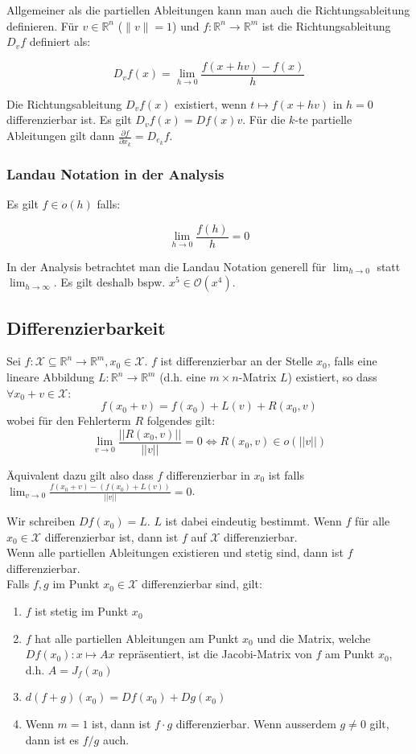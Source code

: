 \documentclass[a4paper,10pt]{article}
\def\R{\mathbb{R}}
\def\X{\mathcal{X}}
\begin{document}
Allgemeiner als die partiellen Ableitungen kann man auch die Richtungsableitung definieren. Für $v \in \R^n$ ($\lVert v \rVert = 1$) und $f: \R^n \to \R^m$ ist die Richtungsableitung $D_v f$ definiert als:

$$D_v f(x) = \lim_{h \rightarrow 0} \frac{f(x + hv) - f(x)}{h}$$

 Die Richtungsableitung $D_v f(x)$ existiert, wenn $t \mapsto f(x + hv)$ in $h = 0$ differenzierbar ist. Es gilt $D_v f(x) = D f(x) v$. Für die $k$-te partielle Ableitungen gilt dann $\frac{\partial f}{\partial x_k} = D_{e_k} f$.

\subsubsection*{Landau Notation in der Analysis}

Es gilt $f \in o(h)$ falls:

$$\lim_{h \to 0} \frac{f(h)}{h} = 0$$

In der Analysis betrachtet man die Landau Notation generell für $\lim_{h \to 0}$ statt $\lim_{h \to \infty}$. Es gilt deshalb bspw. $x^5 \in \mathcal{O}(x^4)$.

\subsection{Differenzierbarkeit}
Sei \(f: \X \subseteq \R^n \to \R^m, x_0 \in \X\). \(f\) ist differenzierbar an der Stelle \(x_0\), falls eine lineare Abbildung \(L: \R^n \to \R^m\) (d.h. eine \(m \times n\)-Matrix \(L\)) existiert, so dass \(\forall x_0 + v \in \X\):
\[f(x_0 + v) = f(x_0) + L(v) + R(x_0,v)\]
wobei für den Fehlerterm \(R\) folgendes gilt: 
$$\lim_{v \to 0} \frac{||R(x_0,v)||}{||v||} = 0 \iff R(x_0, v) \in o(||v||)$$

Äquivalent dazu gilt also dass $f$ differenzierbar in $x_0$ ist falls $\lim_{v \rightarrow 0} \frac{f(x_0 + v) - (f(x_0) + L(v))}{||v||} = 0$.

Wir schreiben \(Df(x_0) = L\). $L$ ist dabei eindeutig bestimmt. Wenn \(f\) für alle \(x_0 \in \X\) differenzierbar ist, dann ist \(f\) auf \(\X\) differenzierbar. \\

Wenn alle partiellen Ableitungen existieren und stetig sind, dann ist \(f\) differenzierbar.\\
Falls \(f,g\) im Punkt \(x_0 \in \X\) differenzierbar sind, gilt:
\begin{enumerate}
  \item \(f\) ist stetig im Punkt \(x_0\)
  \item \(f\) hat alle partiellen Ableitungen am Punkt \(x_0\) und die Matrix, welche \(Df(x_0): x \mapsto Ax\) repräsentiert, ist die Jacobi-Matrix von \(f\) am Punkt \(x_0\), d.h. \(A = J_f(x_0)\)
  \item \(d(f+g)(x_0) = Df(x_0) + Dg(x_0)\)
  \item Wenn \(m = 1\) ist, dann ist \(f\cdot g\) differenzierbar. Wenn ausserdem \(g \ne 0\) gilt, dann ist es \(f/g\) auch.
\end{enumerate}
\end{document}

